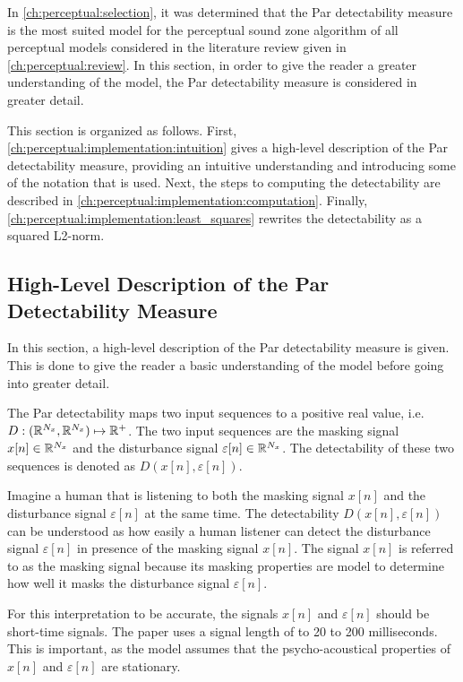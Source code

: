 In \autoref{ch:perceptual:selection}, it was determined that the Par detectability measure is 
the most suited model for the perceptual sound zone algorithm of all perceptual models considered in 
the literature review given in \autoref{ch:perceptual:review}.
In this section, in order to give the reader a greater understanding of the model, 
the Par detectability measure is considered in greater detail.

This section is organized as follows.
First, \autoref{ch:perceptual:implementation:intuition} gives a high-level description of the Par detectability measure, providing 
an intuitive understanding and introducing some of the notation that is used.
Next, the steps to computing the detectability are described in \autoref{ch:perceptual:implementation:computation}.
Finally, \autoref{ch:perceptual:implementation:least_squares} rewrites the detectability as a squared L2-norm.

\subsection{High-Level Description of the Par Detectability Measure}
\label{ch:perceptual:implementation:intuition}
In this section, a high-level description of the Par detectability measure is given.
This is done to give the reader a basic understanding of the model before going into greater detail.

The Par detectability maps two input sequences to a positive real value, i.e. $D: (\mathbb{R}^{N_x}, \mathbb{R}^{N_x})\mapsto \mathbb{R}^{+}$.
The two input sequences are the masking signal $x[n]\in\mathbb{R}^{N_x}$ and the disturbance signal $\varepsilon[n]\in\mathbb{R}^{N_x}$.
The detectability of these two sequences is denoted as $D(x[n], \varepsilon[n])$. 

Imagine a human that is listening to both the masking signal $x[n]$ and the disturbance signal $\varepsilon[n]$ at the same time.
The detectability $D(x[n], \varepsilon[n])$ can be understood as how easily a human listener can detect the disturbance signal 
$\varepsilon[n]$ in presence of the masking signal $x[n]$.
The signal $x[n]$ is referred to as the masking signal because its masking properties are model to determine how well it masks the disturbance signal 
$\varepsilon[n]$.

For this interpretation to be accurate, the signals $x[n]$ and $\varepsilon[n]$ should be short-time signals.
The paper uses a signal length of to 20 to 200 milliseconds.    
This is important, as the model assumes that the psycho-acoustical properties of $x[n]$ 
and $\varepsilon[n]$ are stationary.  

